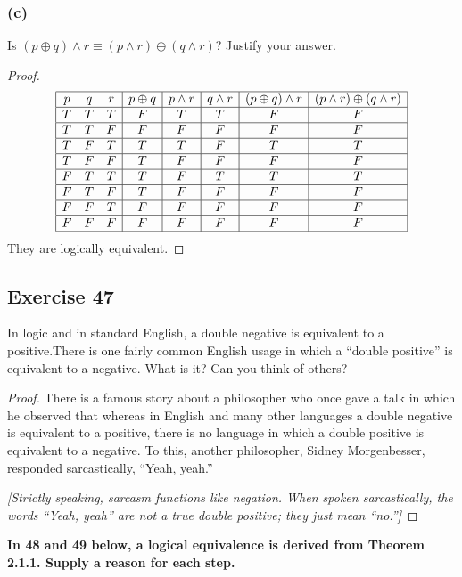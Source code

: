 \documentclass[14pt]{extarticle}
\begin{document}
\subsubsection{(c)} 
Is $(p \oplus q) \wedge r \equiv (p \wedge r) \oplus (q \wedge r)$? Justify your answer.

\begin{proof} 
$$ 
\begin{array}{|ccc|c|c|c|c|c|} 
\hline 
p & q & r & p \oplus q & p \wedge r & q \wedge r & (p \oplus q) \wedge r & (p \wedge r) \oplus (q \wedge r) \\ 
\hline 
T & T & T & F & T & T & F & F \\ 
\hline 
T & T & F & F & F & F & F & F \\ 
\hline 
T & F & T & T & T & F & T & T \\ 
\hline 
T & F & F & T & F & F & F & F \\ 
\hline 
F & T & T & T & F & T & T & T \\ 
\hline 
F & T & F & T & F & F & F & F \\ 
\hline 
F & F & T & F & F & F & F & F \\ 
\hline 
F & F & F & F & F & F & F & F \\ 
\hline 
\end{array} 
$$ 
They are logically equivalent. 
\end{proof}

\subsection{Exercise 47} 
In logic and in standard English, a double negative is equivalent to a positive.There is one fairly common English usage in which a “double positive” is equivalent to a negative. What is it? Can you think of others?

\begin{proof} There is a famous story about a philosopher who once gave a talk in which he observed that whereas in English and many other languages a double negative is equivalent to a positive, there is no language in which a double positive is equivalent to a negative. To this, another philosopher, Sidney
Morgenbesser, responded sarcastically, “Yeah, yeah.”

{\it [Strictly speaking, sarcasm functions like negation. When spoken sarcastically, the words “Yeah, yeah” are not a true double positive; they just mean “no.”]} 
\end{proof}

{\bf In 48 and 49 below, a logical equivalence is derived from Theorem 2.1.1. Supply a reason for each step.}
\end{document}
